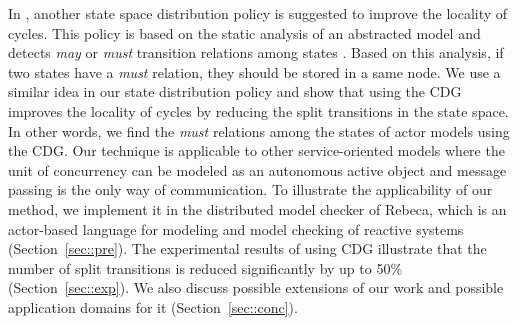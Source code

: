 In \cite{distributionPolicy}, another state space distribution policy is suggested to improve the locality of cycles.
This policy is based on the static analysis of an abstracted model and detects \emph{may} or \emph{must} transition relations among states \cite{mayMustRelation}. Based on this analysis, if two states have a \emph{must} relation, they should be stored in a same node.
We use a similar idea in our state distribution policy and show that using the CDG improves the locality of cycles by reducing the split transitions in the state space. In other words, we find the \emph{must} relations among the states of actor models using the CDG. Our technique is applicable to other service-oriented models where the unit of concurrency can be modeled as an autonomous active object and message passing is the only way of communication. To illustrate the applicability of our method, we implement it in the distributed model checker of Rebeca, which is an actor-based language for modeling and model checking of reactive systems  (Section~\ref{sec::pre}). 
The experimental results of using CDG illustrate that the number of split transitions is reduced significantly by up to  50\% (Section~\ref{sec::exp}). We also discuss possible extensions of our work and possible application domains for it (Section~\ref{sec::conc}).